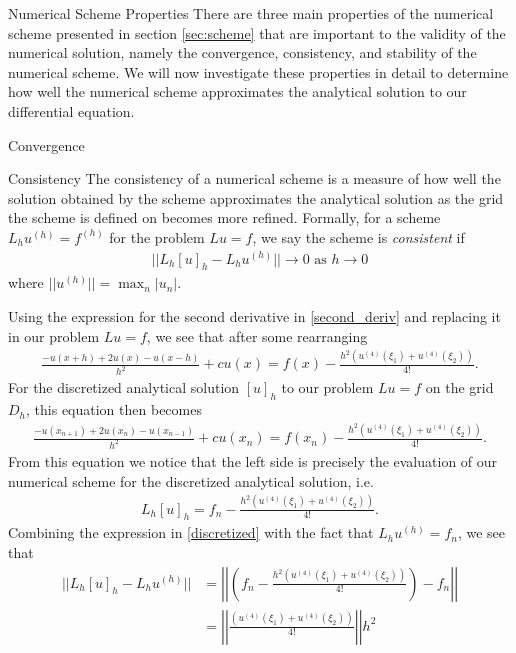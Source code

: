 \documentclass{article}
\begin{document}
\begin{section}{Numerical Scheme Properties}\label{sec:scheme_prop}
  There are three main properties of the numerical scheme presented in section
  \ref{sec:scheme} that are important to the validity of the numerical solution,
  namely the convergence, consistency, and stability of the numerical scheme.
  We will now investigate these properties in detail to determine how well
  the numerical scheme approximates the analytical solution to our differential
  equation.

  \begin{subsection}{Convergence}
  \end{subsection}

  \begin{subsection}{Consistency}
    The consistency of a numerical scheme is a measure of how well the solution
    obtained by the scheme approximates the analytical solution as the grid
    the scheme is defined on becomes more refined. Formally,
    for a scheme $L_h u^{(h)} = f^{(h)}$ for the problem $Lu = f$, we say the
    scheme is \textit{consistent} if
    \begin{align}\label{consistency}
      ||L_h[u]_h - L_h u^{(h)}|| \to 0 \text{\ as $h \to 0$}
    \end{align}
    where $|| u^{(h)} || = \max_n |u_n|$.

    Using the expression for the second
    derivative in \eqref{second_deriv} and replacing it in our problem $Lu = f$, we
    see that after some rearranging
    \begin{align*}
      \frac{-u(x + h) + 2u(x) - u(x-h)}{h^2} + cu(x) = f(x) - \frac{h^2(u^{(4)}(\xi_1) + u^{(4)}(\xi_2))}{4!}.
    \end{align*}
    For the discretized analytical solution $[u]_h$ to our problem $Lu = f$ on the grid $D_h$,
    this equation then becomes
    \begin{align*}
      \frac{-u(x_{n+1}) + 2u(x_n) - u(x_{n-1})}{h^2} + cu(x_n) = f(x_n) - \frac{h^2(u^{(4)}(\xi_1) + u^{(4)}(\xi_2))}{4!}.
    \end{align*}
    From this equation we notice that the left side is precisely the evaluation
    of our numerical scheme for the discretized analytical solution, i.e.
    \begin{align}\label{discretized}
      L_h[u]_h = f_n - \frac{h^2(u^{(4)}(\xi_1) + u^{(4)}(\xi_2))}{4!}.
    \end{align}
    Combining the expression in \eqref{discretized} with the fact that
    $L_hu^{(h)} = f_n$, we see that
    \begin{align*}
      ||L_h[u]_h - L_hu^{(h)}||
      &= \left|\left| \left(f_n - \frac{h^2(u^{(4)}(\xi_1) + u^{(4)}(\xi_2))}{4!}\right) - f_n \right|\right| \\
      &= \left|\left| \frac{(u^{(4)}(\xi_1) + u^{(4)}(\xi_2))}{4!}\right|\right| h^2
    \end{align*}


\end{subsection}
\end{section}
\end{document}
